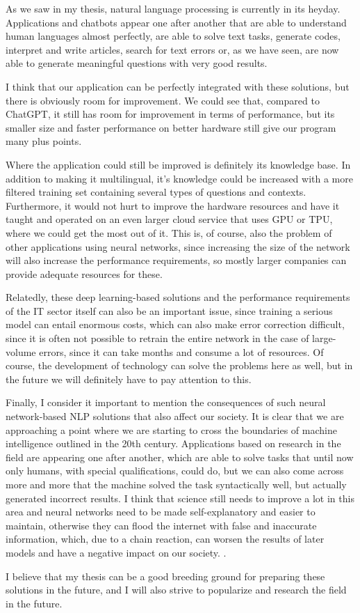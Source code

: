 \documentclass[12pt,a4paper]{report}
\begin{document}

As we saw in my thesis, natural language processing is currently in its heyday. Applications and chatbots appear one after another that are able to understand human languages almost perfectly, are able to solve text tasks, generate codes, interpret and write articles, search for text errors or, as we have seen, are now able to generate meaningful questions with very good results.

I think that our application can be perfectly integrated with these solutions, but there is obviously room for improvement. We could see that, compared to ChatGPT, it still has room for improvement in terms of performance, but its smaller size and faster performance on better hardware still give our program many plus points.

Where the application could still be improved is definitely its knowledge base. In addition to making it multilingual, it's knowledge could be increased with a more filtered training set containing several types of questions and contexts. Furthermore, it would not hurt to improve the hardware resources and have it taught and operated on an even larger cloud service that uses GPU or TPU, where we could get the most out of it. This is, of course, also the problem of other applications using neural networks, since increasing the size of the network will also increase the performance requirements, so mostly larger companies can provide adequate resources for these.

Relatedly, these deep learning-based solutions and the performance requirements of the IT sector itself can also be an important issue, since training a serious model can entail enormous costs, which can also make error correction difficult, since it is often not possible to retrain the entire network in the case of large-volume errors, since it can take months and consume a lot of resources. Of course, the development of technology can solve the problems here as well, but in the future we will definitely have to pay attention to this.

Finally, I consider it important to mention the consequences of such neural network-based NLP solutions that also affect our society. It is clear that we are approaching a point where we are starting to cross the boundaries of machine intelligence outlined in the 20th century. Applications based on research in the field are appearing one after another, which are able to solve tasks that until now only humans, with special qualifications, could do, but we can also come across more and more that the machine solved the task syntactically well, but actually generated incorrect results. I think that science still needs to improve a lot in this area and neural networks need to be made self-explanatory and easier to maintain, otherwise they can flood the internet with false and inaccurate information, which, due to a chain reaction, can worsen the results of later models and have a negative impact on our society. .

I believe that my thesis can be a good breeding ground for preparing these solutions in the future, and I will also strive to popularize and research the field in the future.
\end{document}
